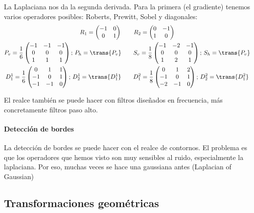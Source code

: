 \documentclass[nochap,palatino,notitlepage]{apuntes}
\begin{document}
La Laplaciana nos da la segunda derivada. Para la primera (el gradiente) tenemos varios operadores posibles: Roberts, Prewitt, Sobel y diagonales:
\begin{gather*}
R_1 = \begin{pmatrix} - 1 & 0 \\ 0 & 1 \end{pmatrix} \qquad R_2 = \begin{pmatrix}0 & -1 \\ 1 & 0 \end{pmatrix} \\
P_v = \frac{1}{6} \begin{pmatrix} -1 & -1 & -1 \\ 0 & 0 & 0 \\ 1 & 1 & 1 \end{pmatrix};\,P_h = \trans{P_v}
\qquad
S_v = \frac{1}{8} \begin{pmatrix} -1 & -2 & -1 \\ 0 & 0 & 0 \\ 1 & 2 & 1 \end{pmatrix};\,S_h = \trans{P_v} \\
D^1_1 = \frac{1}{6} \begin{pmatrix} 0 & 1 & 1 \\ -1 & 0 & 1 \\ -1 & -1 & 0 \end{pmatrix};\,D^1_2 = \trans{D^1_1} \qquad
D^2_1 = \frac{1}{8} \begin{pmatrix} 0 & 1 & 2 \\ -1 & 0 & 1 \\ -2 & -1 & 0 \end{pmatrix};\,D^2_2 = \trans{D^2_1}
\end{gather*}

El realce también se puede hacer con filtros diseñados en frecuencia, más concretamente filtros paso alto.

\paragraph{Detección de bordes} La detección de bordes se puede hacer con el realce de contornos. El problema es que los operadores que hemos visto son muy sensibles al ruido, especialmente la laplaciana. Por eso, muchas veces se hace una gaussiana antes (Laplacian of Gaussian)

\subsection{Transformaciones geométricas}
\end{document}
